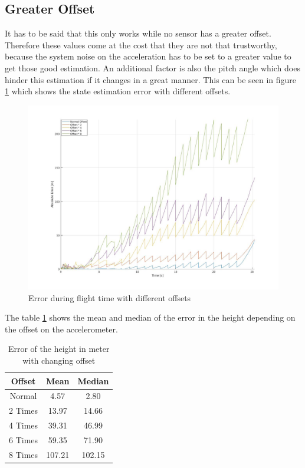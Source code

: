 \subsection{Greater Offset}
It has to be said that this only works while no sensor has a greater offset.
Therefore these values come at the cost that they are not that trustworthy, 
because the system noise on the acceleration has to be set to a greater value to get those good estimation.
An additional factor is also the pitch angle which does hinder this estimation if it changes in a great manner.
This can be seen in figure \ref{fig:PointMassErrorWithOffset} which shows the state estimation error with different offsets.

\begin{figure}[h!]
 \centering
 \includegraphics[width=.8\textwidth]{./Pictures/PointMassErrorWithOffset.jpg}
 \caption{Error during flight time with different offsets}
 \label{fig:PointMassErrorWithOffset}
\end{figure}


The table \ref{tab:PointMassPerformanceWithOffset} shows the mean and median of the error in the height depending on the offset on the accelerometer.

\begin{table}[h!]
\centering
\begin{tabular}{ccc}
\hline
\multicolumn{1}{|c|}{Offset} & \multicolumn{1}{|c|}{Mean}& \multicolumn{1}{|c|}{Median} \\ \hline
%
Normal & 4.57 & 2.80\\
2 Times & 13.97 & 14.66\\
4 Times & 39.31 & 46.99\\
6 Times & 59.35 & 71.90\\
8 Times & 107.21 & 102.15
\end{tabular}
\caption{Error of the height in meter with changing offset}
\label{tab:PointMassPerformanceWithOffset}
\end{table}

